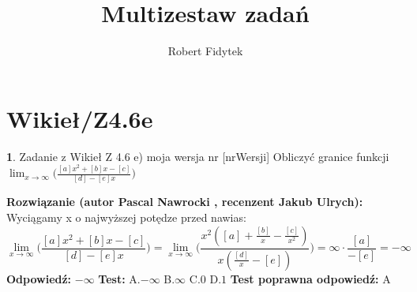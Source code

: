 \documentclass[12pt, a4paper]{article}
\title{Multizestaw zadań}
\author{Robert Fidytek}
\date{}
\theoremstyle{definition} %
\newtheorem{zad}{}
\newcommand{\kategoria}[1]{\section{#1}} %
\newcommand{\zadStart}[1]{\begin{zad}#1\newline} %
\newcommand{\zadStop}{\end{zad}}   %
\newcommand{\rozwStart}[2]{\noindent \textbf{Rozwiązanie (autor #1 , recenzent #2): }\newline} %
\newcommand{\rozwStop}{\newline}                                            %
\newcommand{\odpStart}{\noindent \textbf{Odpowiedź:}\newline}    %
\newcommand{\odpStop}{\newline}                                             %
\newcommand{\testStart}{\noindent \textbf{Test:}\newline} %
\newcommand{\testStop}{\newline} %
\newcommand{\kluczStart}{\noindent \textbf{Test poprawna odpowiedź:}\newline} %
\newcommand{\kluczStop}{\newline} %
\begin{document}
\maketitle


\kategoria{Wikieł/Z4.6e}
\zadStart{Zadanie z Wikieł Z 4.6 e) moja wersja nr [nrWersji]}
Obliczyć granice funkcji $\displaystyle{\lim_{x \to \infty}}\bigg(\frac{[a]x^2+[b]x-[c]}{[d]-[e]x}\bigg)$
\zadStop
\rozwStart{Pascal Nawrocki}{Jakub Ulrych}
Wyciągamy x o najwyższej potędze przed nawias:
$$\displaystyle{\lim_{x \to \infty}}\bigg(\frac{[a]x^2+[b]x-[c]}{[d]-[e]x}\bigg)=\displaystyle{\lim_{x \to \infty}}\bigg(\frac{x^2([a]+\frac{[b]}{x}-\frac{[c]}{x^2})}{x(\frac{[d]}{x}-[e])}\bigg)=\infty\cdot\frac{[a]}{-[e]}=-\infty$$
\rozwStop
\odpStart
$-\infty$
\odpStop
\testStart
A.$-\infty$
B.$\infty$
C.$0$
D.$1$
\testStop
\kluczStart
A
\kluczStop
\end{document}

